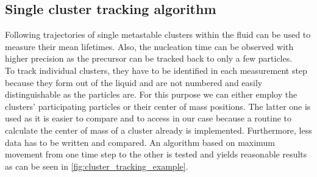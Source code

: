 \subsection{Single cluster tracking algorithm}
\label{sec:tracking}
Following trajectories of single metastable clusters within the fluid can be used to measure their mean lifetimes. Also, the nucleation time can be observed with higher precision as the precursor can be tracked back to only a few particles.\\ 
To track individual clusters, they have to be identified in each measurement step because they form out of the liquid and are not numbered and easily distinguishable as the particles are. For this purpose we can either employ the clusters' participating particles or their center of mass positions. The latter one is used as it is easier to compare and to access in our case because a routine to calculate the center of mass of a cluster already is implemented. Furthermore, less data has to be written and compared. An algorithm based on maximum movement from one time step to the other is tested and yields reasonable results as can be seen in \autoref{fig:cluster_tracking_example}.\\

